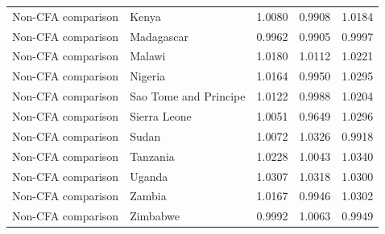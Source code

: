 \begin{table}
\begin{tabular}[t]{llrrr}
Non-CFA comparison & Kenya & 1.0080 & 0.9908 & 1.0184\\
\addlinespace
Non-CFA comparison & Madagascar & 0.9962 & 0.9905 & 0.9997\\
Non-CFA comparison & Malawi & 1.0180 & 1.0112 & 1.0221\\
Non-CFA comparison & Nigeria & 1.0164 & 0.9950 & 1.0295\\
Non-CFA comparison & Sao Tome and Principe & 1.0122 & 0.9988 & 1.0204\\
Non-CFA comparison & Sierra Leone & 1.0051 & 0.9649 & 1.0296\\
\addlinespace
Non-CFA comparison & Sudan & 1.0072 & 1.0326 & 0.9918\\
Non-CFA comparison & Tanzania & 1.0228 & 1.0043 & 1.0340\\
Non-CFA comparison & Uganda & 1.0307 & 1.0318 & 1.0300\\
Non-CFA comparison & Zambia & 1.0167 & 0.9946 & 1.0302\\
Non-CFA comparison & Zimbabwe & 0.9992 & 1.0063 & 0.9949\\
\bottomrule
\end{tabular}
\end{table}
